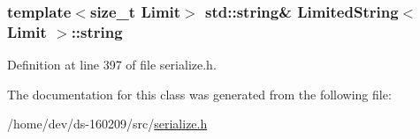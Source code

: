 \subsubsection[{string}]{\setlength{\rightskip}{0pt plus 5cm}template$<$size\+\_\+t Limit$>$ std\+::string\& {\bf Limited\+String}$<$ Limit $>$\+::string\hspace{0.3cm}{\ttfamily [protected]}}\label{class_limited_string_a3f1d004f4632f7b2fda1a5a5afc266f7}


Definition at line 397 of file serialize.\+h.



The documentation for this class was generated from the following file\+:\begin{DoxyCompactItemize}
\item 
/home/dev/ds-\/160209/src/\hyperlink{serialize_8h}{serialize.\+h}\end{DoxyCompactItemize}
